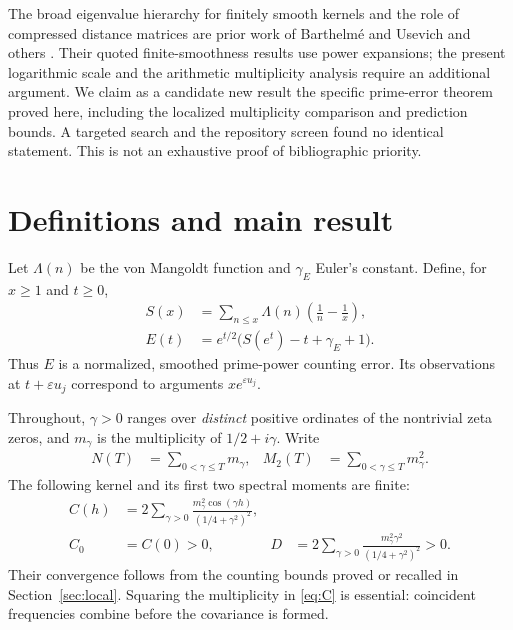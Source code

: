 \documentclass[11pt]{article}
\theoremstyle{definition}\newtheorem{definition}[theorem]{Definition}
\theoremstyle{remark}\newtheorem{remark}[theorem]{Remark}
\newcommand{\eps}{\varepsilon}
\begin{document}
The broad eigenvalue hierarchy for finitely smooth kernels and the role
of compressed distance matrices are prior work of Barthelm\'e and
Usevich and others \cite{BU}. Their quoted finite-smoothness results use
power expansions; the present logarithmic scale and the arithmetic
multiplicity analysis require an additional argument. We claim as a
candidate new result the specific prime-error theorem proved here,
including the localized multiplicity comparison and prediction bounds.
A targeted search and the repository screen found no identical
statement. This is not an exhaustive proof of bibliographic priority.

\section{Definitions and main result}
Let $\Lambda(n)$ be the von Mangoldt function and $\gamma_E$ Euler's
constant. Define, for $x\ge1$ and $t\ge0$,
\begin{align}
 S(x)&=\sum_{n\le x}\Lambda(n)\left(\frac1n-\frac1x\right),\label{eq:S}\\
 E(t)&=e^{t/2}\bigl(S(e^t)-t+\gamma_E+1\bigr).\label{eq:E}
\end{align}
Thus $E$ is a normalized, smoothed prime-power counting error. Its
observations at $t+\eps u_j$ correspond to arguments $x e^{\eps u_j}$.

Throughout, $\gamma>0$ ranges over \emph{distinct} positive ordinates of
the nontrivial zeta zeros, and $m_\gamma$ is the multiplicity of
$1/2+i\gamma$. Write
\begin{align}
 N(T)&=\sum_{0<\gamma\le T}m_\gamma,&
 M_2(T)&=\sum_{0<\gamma\le T}m_\gamma^2.\label{eq:counts}
\end{align}
The following kernel and its first two spectral moments are finite:
\begin{align}
 C(h)&=2\sum_{\gamma>0}
       \frac{m_\gamma^2\cos(\gamma h)}{(1/4+\gamma^2)^2},\label{eq:C}\\
 C_0&=C(0)>0,&
 D&=2\sum_{\gamma>0}\frac{m_\gamma^2\gamma^2}{(1/4+\gamma^2)^2}>0.
 \label{eq:CD}
\end{align}
Their convergence follows from the counting bounds proved or recalled
in Section~\ref{sec:local}. Squaring the multiplicity in \eqref{eq:C}
is essential: coincident frequencies combine before the covariance is
formed.
\end{document}
